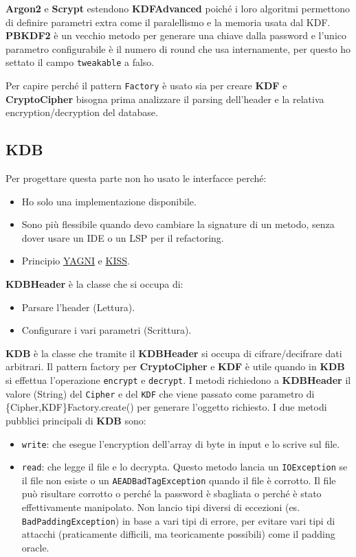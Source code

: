 \documentclass[a4paper,12pt]{report}
\begin{document}
\textbf{Argon2} e \textbf{Scrypt} estendono \textbf{KDFAdvanced} poiché i loro
algoritmi permettono di definire parametri extra come il paralellismo e la memoria usata
dal KDF. \textbf{PBKDF2} è un vecchio metodo per generare una chiave dalla password e
l'unico parametro configurabile è il numero di round che usa internamente, per questo
ho settato il campo \texttt{tweakable} a falso.

Per capire perché il pattern \texttt{Factory} è usato sia per creare \textbf{KDF}
e \textbf{CryptoCipher} bisogna prima analizzare il parsing dell'header e la relativa
encryption/decryption del database.

\subsection*{KDB}

Per progettare questa parte non ho usato le interfacce perché:
\begin{itemize}
  \item Ho solo una implementazione disponibile.
  \item Sono più flessibile quando devo cambiare la signature di un metodo, senza dover usare un IDE o un LSP per il refactoring.
  \item Principio \href{https://en.wikipedia.org/wiki/You_aren%27t_gonna_need_it}{YAGNI} e \href{https://en.wikipedia.org/wiki/KISS_principle}{KISS}.
\end{itemize}

\textbf{KDBHeader} è la classe che si occupa di:
\begin{itemize}
  \item Parsare l'header (Lettura).
  \item Configurare i vari parametri (Scrittura).
\end{itemize}

\textbf{KDB} è la classe che tramite il \textbf{KDBHeader} si occupa di cifrare/decifrare
dati arbitrari.
Il pattern factory per \textbf{CryptoCipher} e \textbf{KDF} è utile quando in \textbf{KDB}
si effettua l'operazione \texttt{encrypt} e \texttt{decrypt}. I metodi richiedono
a \textbf{KDBHeader} il valore (String) del \texttt{Cipher} e del \texttt{KDF} che viene
passato come parametro di \{Cipher,KDF\}Factory.create() per generare l'oggetto
richiesto.
I due metodi pubblici principali di \textbf{KDB} sono:
\begin{itemize}
  \item \texttt{write}: che esegue l'encryption dell'array di byte in input e lo scrive sul file.
  \item \texttt{read}: che legge il file e lo decrypta. Questo metodo lancia un
    \texttt{IOException} se il file non esiste o un \texttt{AEADBadTagException} quando il file è corrotto.
    Il file può risultare corrotto o perché la password è sbagliata o perché è stato effettivamente manipolato.
    Non lancio tipi diversi di eccezioni (es. \texttt{BadPaddingException}) in base a vari tipi di errore,
    per evitare vari tipi di attacchi (praticamente difficili, ma teoricamente possibili) come
    il padding oracle.
\end{itemize}
\end{document}
